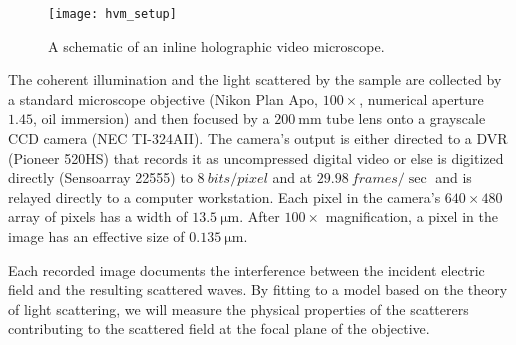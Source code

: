 \begin{figure}
  \centering
  \texttt{[image: hvm\_setup]}
  \caption{A schematic of an inline holographic video microscope.}
  \label{fig:hvm_setup}
\end{figure}


The coherent illumination and the light scattered by the sample are collected by a
standard microscope objective (Nikon Plan Apo, $\num{100}\times$,
numerical aperture $\num{1.45}$, oil immersion) and then focused
by a $\SI{200}{\mm}$ tube lens onto a grayscale CCD camera
(NEC TI-324AII).
The camera's output is either directed to a DVR (Pioneer 520HS) that records
it as uncompressed digital video or else is digitized directly (Sensoarray 22555)
to $\SI{8}{bits\per pixel}$ and at $\SI{29.98}{frames\per\sec}$ and is relayed
directly to a computer workstation.
Each pixel in the camera's $\si{640\times 480}$ array of pixels has a width of
$\SI{13.5}{\um}$. After $100\times$ magnification, a pixel in the
image has an effective size of $\SI{0.135}{\um}$.

Each recorded image documents the interference between the incident
electric field and the resulting scattered waves. By fitting
to a model based on the theory of light scattering, we will measure the physical
properties of the scatterers contributing to the scattered field
at the focal plane of the objective.





